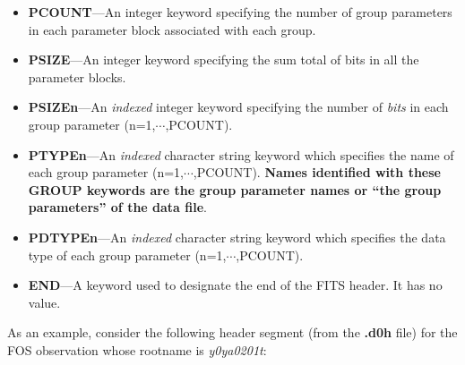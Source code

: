 \begin{itemize}
\item {\bf PCOUNT}---An integer keyword specifying the number of group 
parameters in each parameter block associated with each group.

\item {\bf PSIZE}---An integer keyword specifying the sum total of bits 
in all the parameter blocks.

\item {\bf PSIZEn}---An {\it indexed} integer keyword specifying the number 
of {\it bits} in each group parameter (n=1,$\cdots$,PCOUNT).

\item {\bf PTYPEn}---An {\it indexed} character string keyword which 
specifies the name of each group parameter (n=1,$\cdots$,PCOUNT).  {\bf Names 
identified with these GROUP keywords are the group parameter names or 
``the group parameters'' of the data file}.

\item {\bf PDTYPEn}---An {\it indexed} character string keyword which 
specifies the data type of each group parameter (n=1,$\cdots$,PCOUNT).
  
\item {\bf END}---A keyword used to designate the end of the FITS header.  It
has no value.
\newpage

\end{itemize}

As an example, 
consider the following header segment (from the {\bf .d0h} file)
for the FOS observation whose rootname is {\it y0ya0201t}:

